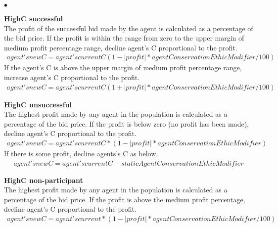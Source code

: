 \documentclass{article} %
\newenvironment{tightitemize}{
                \begin{list}{$\bullet$}{
                    \setlength{\itemsep}{-1pt}}{\setlength{\topsep}{0pt}}}{
                \end{list}}
\begin{document}
\begin{tightitemize}
\item {\bf HighC successful}\\ %
The profit of the successful bid made by the agent is calculated as a percentage 
of the bid price. If the profit is within the range from zero to the upper 
margin of medium profit percentage range, decline agent's C proportional to 
the profit. 
\begin{equation}\label{xx}
\begin{split}
agent's new C = agent's current C ( 1- |profit| * agentConservationEthicModifier/100)
\end{split}
\end{equation}
If the agent's C is above the upper margin of medium profit percentage 
range, increase agent's C proportional to the profit.
\begin{equation}\label{xx}
\begin{split}
agent's new C = agent's current C ( 1+ |profit| * agentConservationEthicModifier/100)
\end{split}
\end{equation}

\item {\bf HighC unsuccessful}\\ %
The highest profit made by any agent in the population is calculated as
 a percentage of the bid price. If the profit is below zero (no profit 
has been made), decline agent's C proportional to the profit. 
\begin{equation}\label{xx}
\begin{split}
agent's new C  = agent's current C * (1 - |profit| * agentConservationEthicModifier)
\end{split}
\end{equation}
If there is some profit, decline agents's C as below.
\begin{equation}\label{xx}
\begin{split}
agent's new C = agent's current C - staticAgentConservationEthicModifier
\end{split}
\end{equation}

\item {\bf HighC non-participant}\\  %
The highest profit made by any agent in the population is calculated 
as a percentage of the bid price. If the profit is above the medium 
profit percentage, decline agent's C proportional to the profit.
\begin{equation}\label{xx}
\begin{split}
agent's new C = agent's current  * (1 - |profit| * agentConservationEthicModifier/100)
\end{split}
\end{equation}


\end{tightitemize}
\end{document}
